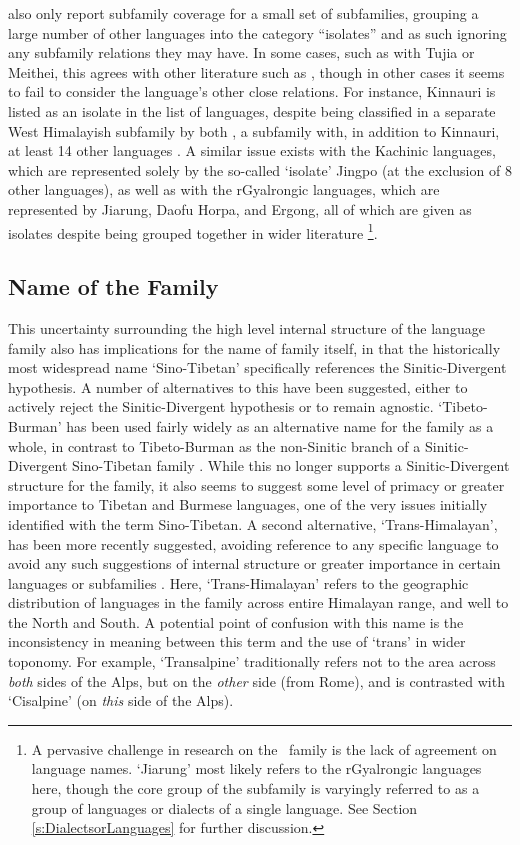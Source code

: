  also only report subfamily coverage for a small set of subfamilies, grouping a large number of other languages into the category ``isolates'' and as such ignoring any subfamily relations they may have. In some cases, such as with Tujia or Meithei, this agrees with other literature such as , though in other cases it seems to fail to consider the language's other close relations. For instance, Kinnauri is listed as an isolate in the list of languages, despite being classified in a separate West Himalayish subfamily by both , a subfamily with, in addition to Kinnauri, at least 14 other languages \cite{glottolog}. A similar issue exists with the Kachinic languages, which are represented solely by the so-called `isolate' Jingpo (at the exclusion of 8 other languages), as well as with the rGyalrongic languages, which are represented by Jiarung, Daofu Horpa, and Ergong, all of which are given as isolates despite being grouped together in wider literature \cites{Honkasalo2019}{Gates2021}\footnote{A pervasive challenge in research on the \lfam\ family is the lack of agreement on language names. `Jiarung' most likely refers to the rGyalrongic languages here, though the core group of the subfamily is varyingly referred to as a group of languages or dialects of a single language. See Section \ref{s:DialectsorLanguages} for further discussion.}.

\subsection{Name of the Family}

This uncertainty surrounding the high level internal structure of the language family also has implications for the name of family itself, in that the historically most widespread name `Sino-Tibetan' specifically references the Sinitic-Divergent hypothesis. A number of alternatives to this have been suggested, either to actively reject the Sinitic-Divergent hypothesis or to remain agnostic. `Tibeto-Burman' has been used fairly widely as an alternative name for the family as a whole, in contrast to Tibeto-Burman as the non-Sinitic branch of a Sinitic-Divergent Sino-Tibetan family \cite{VanDriem2007}. While this no longer supports a Sinitic-Divergent structure for the family, it also seems to suggest some level of primacy or greater importance to Tibetan and Burmese languages, one of the very issues initially identified with the term Sino-Tibetan. A second alternative, `Trans-Himalayan', has been more recently suggested, avoiding reference to any specific language to avoid any such suggestions of internal structure or greater importance in certain languages or subfamilies \cite{BlenchPost2013}. Here, `Trans-Himalayan' refers to the geographic distribution of languages in the family across entire Himalayan range, and well to the North and South. A potential point of confusion with this name is the inconsistency in meaning between this term and the use of `trans' in wider toponomy. For example, `Transalpine' traditionally refers not to the area across \textit{both} sides of the Alps, but on the \textit{other} side (from Rome), and is contrasted with `Cisalpine' (on \textit{this} side of the Alps).

